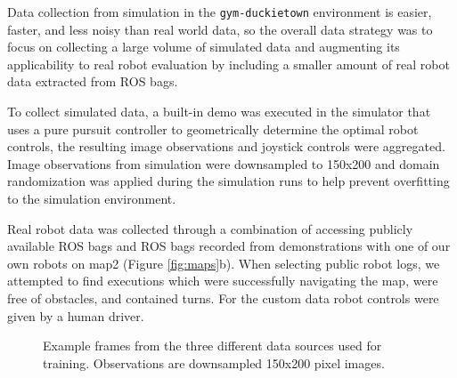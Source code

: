 \documentclass{article}
\begin{document}
Data collection from simulation in the \texttt{gym-duckietown} environment is easier, faster, and less noisy than real world data, so the overall data strategy was to focus on collecting a large volume of simulated data and augmenting its applicability to real robot evaluation by including a smaller amount of real robot data extracted from ROS bags.

To collect simulated data, a built-in demo was executed in the simulator that uses a pure pursuit controller \cite{DBLP:journals/corr/PadenCYYF16} to geometrically determine the optimal robot controls, the resulting image observations and joystick controls were aggregated. Image observations from simulation were downsampled to 150x200 and domain randomization was applied during the simulation runs to help prevent overfitting to the simulation environment.

Real robot data was collected through a combination of accessing publicly available ROS bags \cite{paull17duckietown} and ROS bags recorded from demonstrations with one of our own robots on map2 (Figure \ref{fig:maps}b). When selecting public robot logs, we attempted to find executions which were successfully navigating the map, were free of obstacles, and contained turns. For the custom data robot controls were given by a human driver.

\begin{figure}
\centering
    \qquad
    \qquad
    \caption{Example frames from the three different data sources used for training. Observations are downsampled 150x200 pixel images.}
    \label{fig:data_examples}
\end{figure}
\end{document}
